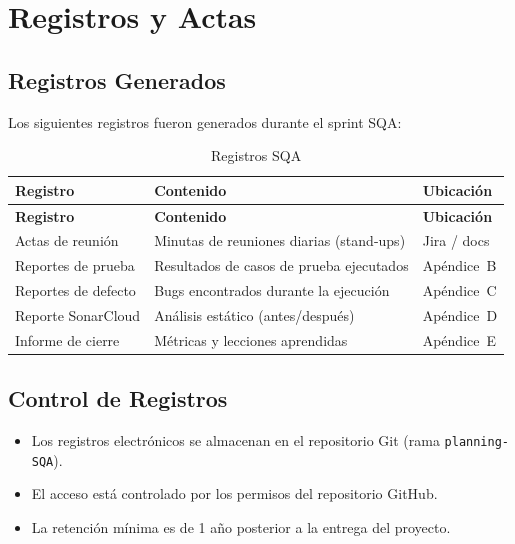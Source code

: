 \chapter{Registros y Actas}
\label{sec:registros}

\section{Registros Generados}
\label{sec:registros-generados}

Los siguientes registros fueron generados durante el sprint SQA:

\begin{longtable}{lp{5cm}p{5cm}}
\caption{Registros SQA}
\label{tab:registros}\\
\toprule
\textbf{Registro} & \textbf{Contenido} & \textbf{Ubicación}\\
\midrule
\endfirsthead
\toprule
\textbf{Registro} & \textbf{Contenido} & \textbf{Ubicación}\\
\midrule
\endhead
\bottomrule
\endfoot

Actas de reunión & Minutas de reuniones diarias (stand-ups) & Jira / docs\\

Reportes de prueba & Resultados de casos de prueba ejecutados & Apéndice~B\\

Reportes de defecto & Bugs encontrados durante la ejecución & Apéndice~C\\

Reporte SonarCloud & Análisis estático (antes/después) & Apéndice~D\\

Informe de cierre & Métricas y lecciones aprendidas & Apéndice~E\\

\end{longtable}

\section{Control de Registros}
\label{sec:control-registros}

\begin{itemize}
    \item Los registros electrónicos se almacenan en el repositorio Git (rama \texttt{planning-SQA}).
    \item El acceso está controlado por los permisos del repositorio GitHub.
    \item La retención mínima es de 1 año posterior a la entrega del proyecto.
\end{itemize}
